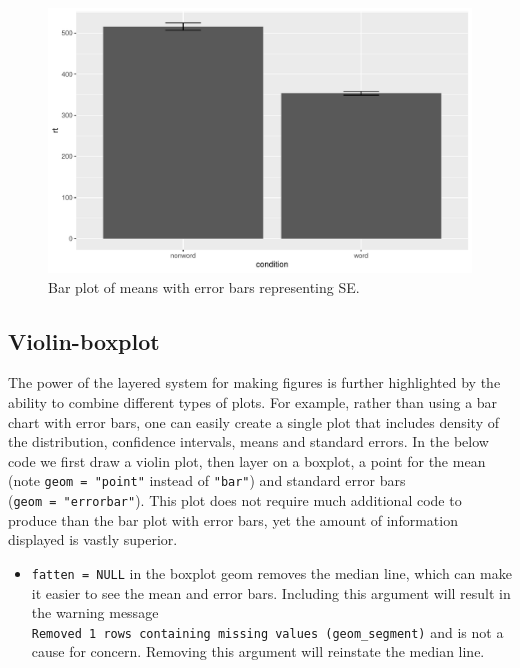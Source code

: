 \documentclass[
  english,
  doc,floatsintext]{apa6}
\providecommand{\tightlist}{%
  \setlength{\itemsep}{0pt}\setlength{\parskip}{0pt}}
\begin{document}
\begin{figure}

{\centering \includegraphics[width=1\linewidth]{images/badbar2-1} 

}

\caption{Bar plot of means with error bars representing SE.}\label{fig:badbar2}
\end{figure}

\hypertarget{violin-boxplot}{%
\subsection{Violin-boxplot}\label{violin-boxplot}}

The power of the layered system for making figures is further highlighted by the ability to combine different types of plots. For example, rather than using a bar chart with error bars, one can easily create a single plot that includes density of the distribution, confidence intervals, means and standard errors. In the below code we first draw a violin plot, then layer on a boxplot, a point for the mean (note \texttt{geom\ =\ "point"} instead of \texttt{"bar"}) and standard error bars (\texttt{geom\ =\ "errorbar"}). This plot does not require much additional code to produce than the bar plot with error bars, yet the amount of information displayed is vastly superior.

\begin{itemize}
\tightlist
\item
  \texttt{fatten\ =\ NULL} in the boxplot geom removes the median line, which can make it easier to see the mean and error bars. Including this argument will result in the warning message \texttt{Removed\ 1\ rows\ containing\ missing\ values\ (geom\_segment)} and is not a cause for concern. Removing this argument will reinstate the median line.
\end{itemize}
\end{document}

